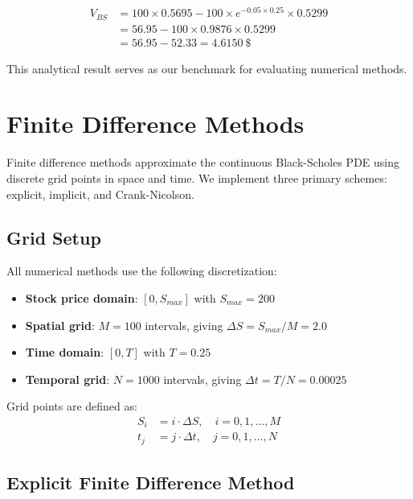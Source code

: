 \documentclass[12pt,a4paper]{article}
\numberwithin{algorithm}{subsection}
\begin{document}
\begin{align}
V_{BS} &= \num{100} \times \num{0.5695} - \num{100} \times e^{-\num{0.05} \times \num{0.25}} \times \num{0.5299} \\
       &= \num{56.95} - \num{100} \times \num{0.9876} \times \num{0.5299} \\
       &= \num{56.95} - \num{52.33} = \SI{4.6150}{\$}
\end{align}

This analytical result serves as our benchmark for evaluating numerical methods.

\section{Finite Difference Methods}
\label{sec:fdm-methods}

Finite difference methods approximate the continuous Black-Scholes PDE using discrete grid points in space and time. We implement three primary schemes: explicit, implicit, and Crank-Nicolson.

\subsection{Grid Setup}

All numerical methods use the following discretization:

\begin{itemize}
\item \textbf{Stock price domain}: $[0, S_{max}]$ with $S_{max} = \num{200}$
\item \textbf{Spatial grid}: $M = \num{100}$ intervals, giving $\Delta S = S_{max}/M = \num{2.0}$
\item \textbf{Time domain}: $[0, T]$ with $T = 0.25$
\item \textbf{Temporal grid}: $N = \num{1000}$ intervals, giving $\Delta t = T/N = \num{0.00025}$
\end{itemize}

Grid points are defined as:
\begin{align}
S_i &= i \cdot \Delta S, \quad i = 0, 1, \ldots, M \\
t_j &= j \cdot \Delta t, \quad j = 0, 1, \ldots, N
\end{align}

\subsection{Explicit Finite Difference Method}
\end{document}

